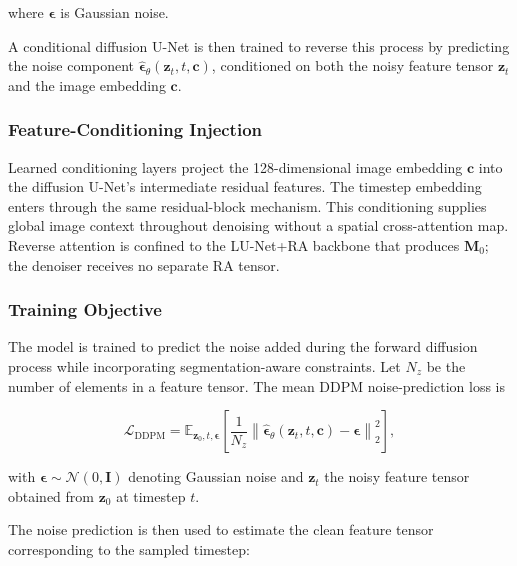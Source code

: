 \documentclass[jimaging,article,submit,pdftex,moreauthors]{Definitions/mdpi}%
\begin{document}
where $\boldsymbol{\epsilon}$ is Gaussian noise.



A conditional diffusion U-Net is then trained to reverse this process by predicting the noise component $\hat{\boldsymbol{\epsilon}}_\theta(\mathbf{z}_t,t,\mathbf{c})$, conditioned on both the noisy feature tensor $\mathbf{z}_t$ and the image embedding $\mathbf{c}$.





\subsubsection{Feature-Conditioning Injection}



Learned conditioning layers project the 128-dimensional image embedding $\mathbf{c}$ into the diffusion U-Net's intermediate residual features. The timestep embedding enters through the same residual-block mechanism. This conditioning supplies global image context throughout denoising without a spatial cross-attention map. Reverse attention is confined to the LU-Net+RA backbone that produces $\mathbf{M}_0$; the denoiser receives no separate RA tensor.



\subsubsection{Training Objective}



The model is trained to predict the noise added during the forward diffusion process while incorporating segmentation-aware constraints. Let $N_z$ be the number of elements in a feature tensor. The mean DDPM noise-prediction loss is

\begin{equation}
\mathcal{L}_{\text{DDPM}}=
\mathbb{E}_{\mathbf{z}_0,t,\boldsymbol{\epsilon}}\left[
\frac{1}{N_z}\left\|
\hat{\boldsymbol{\epsilon}}_\theta(\mathbf{z}_t,t,\mathbf{c})-
\boldsymbol{\epsilon}
\right\|_2^2
\right],
\end{equation}

with $\boldsymbol{\epsilon}\sim\mathcal{N}(0,\mathbf{I})$ denoting Gaussian noise and $\mathbf{z}_t$ the noisy feature tensor obtained from $\mathbf{z}_0$ at timestep $t$.

The noise prediction is then used to estimate the clean feature tensor corresponding to the sampled timestep:
\end{document}
